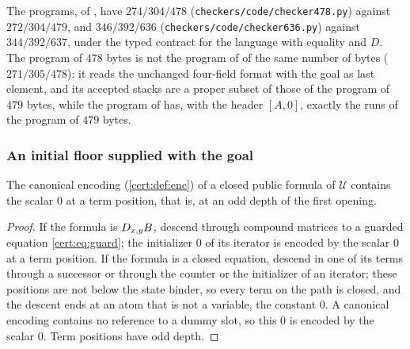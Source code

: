 The programs, of , have $274/304/478$
(\texttt{checkers/code/checker478.py}) against $272/304/479$, and
$346/392/636$ (\texttt{checkers/code/checker636.py}) against $344/392/637$,
under the typed contract for the language with equality and $D$. The program of
$478$ bytes is not the program of  of the same number of
bytes ($271/305/478$): it reads the unchanged four-field format with the goal
as last element, and its accepted stacks are a proper subset of those of the
program of $479$ bytes, while the program of  has, with
the header $[A,0]$, exactly the runs of the program of $479$ bytes.

\subsubsection*{An initial floor supplied with the goal}

\begin{lemma}\label{cert:lem:guarded-zero}
The canonical encoding (\cref{cert:def:enc}) of a closed public formula of
$\mathcal U$ contains the scalar $0$ at a term position, that is, at an odd
depth of the first opening.
\end{lemma}
\begin{proof}
If the formula is $D_{x,y}B$, descend through compound matrices to a guarded
equation \eqref{cert:eq:guard}; the initializer $0$ of its iterator is encoded
by the scalar $0$ at a term position. If the formula is a closed equation,
descend in one of its terms through a successor or through the counter or the
initializer of an iterator; these positions are not below the state binder,
so every term on the path is closed, and the descent ends at an atom that is
not a variable, the constant $0$. A canonical encoding contains no reference to
a dummy slot, so this $0$ is encoded by the scalar $0$. Term positions have odd
depth.
\end{proof}

